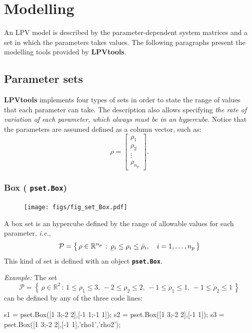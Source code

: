 \documentclass[fleqn,11pt]{article}
\newcommand{\lcode}[1]{\textbf{%
    \lstinline[style=mystyle]{#1}}}
\newcommand{\p}{\rho}
\newcommand{\Rset}{\mathbb{R}}
\newcommand{\Pset}{\mathcal{P}}
\newcommand{\maxS}[1]{\bar{#1}}
\newcommand{\minS}[1]{\underaccent{\bar}{#1}}
\newcommand{\lpvtool}{\textbf{LPVtools}\xspace}
\newcommand{\ie}{{\em i.e.}\xspace}
\newcommand{\example}{\noindent\emph{Example:}\xspace}
\begin{document}
\section{Modelling}\label{sec:model}

An LPV model is described by the parameter-dependent system matrices and a set in which the parameters takes values. The following paragraphs present the modelling tools provided by \lpvtool.

\subsection{Parameter sets}\label{ssec:parset}

\lpvtool implements four types of sets in order to state the range of  values that each parameter can take. The description also allows specifying \emph{the rate of variation of each parameter, which always must be in an hypercube}. Notice that the parameters are assumed defined as a column vector, such as:
\begin{equation*}
    \p = \begin{bmatrix}
          \p_1 \\
          \p_2 \\
          \vdots \\
          \p_{n_p}
        \end{bmatrix}.
\end{equation*}

\subsubsection{Box (\texorpdfstring{\lcode{pset.Box}}{pset.Box})}\label{sssec:box}

\begin{figure}
  \vspace{-5ex}
  \centering
  \texttt{[image: figs/fig\_set\_Box.pdf]}
\end{figure}
A box set is an hypercube defined by the range of allowable values for each parameter, \ie,
\begin{equation*}
    \Pset = \left\{\,\p\in\Rset^{n_p}\,:\,\minS{\p}_i\leq\p_i\leq\maxS{\p}_i,\quad i=1,\dots,n_p\,\right\}
\end{equation*}
This kind of set is defined with an object \lcode{pset.Box}.

\example The set
\begin{equation*}
    \Pset = \left\{\,\p\in\Rset^{2}\,:
    \,1\leq\p_1\leq 3,\,-2\leq\p_2\leq 2,
    \,-1\leq\dot\p_1\leq 1,\,-1\leq\dot\p_2\leq 1
    \,\right\}
\end{equation*}
can be defined by any of the three code lines:
\begin{code}
s1 = pset.Box([1 3;-2 2],[-1 1;-1 1]);
s2 = pset.Box([1 3;-2 2],[-1 1]);
s3 = pset.Box([1 3;-2 2],[-1 1],{'rho1','rho2'});
\end{code}
\end{document}
